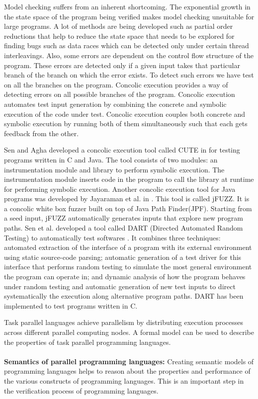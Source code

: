 Model checking suffers from an inherent shortcoming. The exponential growth in the state space of the program being verified makes model checking unsuitable for large programs. A lot of methods are being developed such as partial order reductions that help to reduce the state space that needs to be explored for finding bugs such as data races which can be detected only under certain thread interleavings. Also, some errors are dependent on the control flow structure of the program. These errors are detected only if a given input takes that particular branch of the branch on which the error exists. To detect such errors we have test on all the branches on the program. Concolic execution provides a way of detecting errors on all possible branches of the program. Concolic execution automates test input generation by combining the concrete and symbolic execution of the code under test. Concolic execution couples both concrete and symbolic execution by running both of them simultaneously such that each gets feedback from the other.

Sen and Agha developed a concolic execution tool called CUTE in \cite{sen2006cute} for testing programs written in C and Java. The tool consists of two modules: an instrumentation module and library to perform symbolic execution. The instrumentation module inserts code in the program to call the library at runtime for performing symbolic execution. Another concolic execution tool for Java programs was developed by Jayaraman et al. in \cite{jayaraman2009jfuzz}. This tool is called jFUZZ. It is a concolic white box fuzzer built on top of Java Path Finder(JPF). Starting from a seed input, jFUZZ automatically generates inputs that explore new program paths. Sen et al. developed a tool called DART (Directed Automated Random Testing) to automatically test softwares \cite{godefroid2005dart} . It combines three techniques: automated extraction of the interface of a program with its external environment using static source-code parsing; automatic generation of a test driver for this interface that performs random testing to simulate the most general environment the program can operate in; and dynamic analysis of how the program behaves under random testing and automatic generation of new test inputs to direct systematically the execution along alternative program paths. DART has been implemented to test programs written in C.

Task parallel languages achieve parallelism by distributing execution processes across different parallel computing nodes. A formal model can be used to describe the properties of task parallel programming languages. 
\\
\\
\textbf{Semantics of parallel programming languages:}
Creating semantic models of programming languages helps to reason about the properties and performance of the various constructs of programming languages. This is an important step in the verification process of programming languages.

